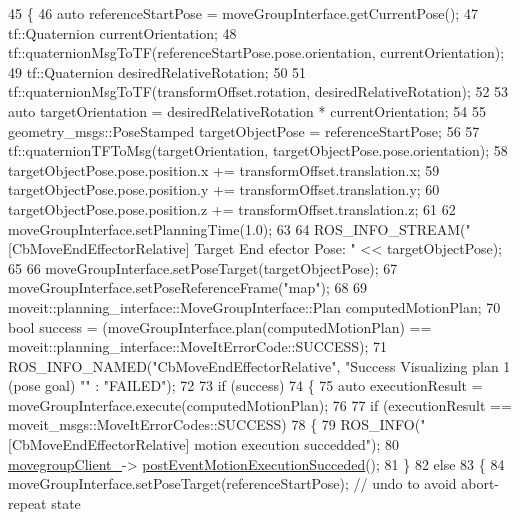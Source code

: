 \begin{DoxyCode}
45     \{
46         \textcolor{keyword}{auto} referenceStartPose = moveGroupInterface.getCurrentPose();
47         tf::Quaternion currentOrientation;
48         tf::quaternionMsgToTF(referenceStartPose.pose.orientation, currentOrientation);
49         tf::Quaternion desiredRelativeRotation;
50 
51         tf::quaternionMsgToTF(transformOffset.rotation, desiredRelativeRotation);
52 
53         \textcolor{keyword}{auto} targetOrientation = desiredRelativeRotation * currentOrientation;
54 
55         geometry\_msgs::PoseStamped targetObjectPose = referenceStartPose;
56 
57         tf::quaternionTFToMsg(targetOrientation, targetObjectPose.pose.orientation);
58         targetObjectPose.pose.position.x += transformOffset.translation.x;
59         targetObjectPose.pose.position.y += transformOffset.translation.y;
60         targetObjectPose.pose.position.z += transformOffset.translation.z;
61 
62         moveGroupInterface.setPlanningTime(1.0);
63 
64         ROS\_INFO\_STREAM(\textcolor{stringliteral}{"[CbMoveEndEffectorRelative] Target End efector Pose: "} << targetObjectPose);
65 
66         moveGroupInterface.setPoseTarget(targetObjectPose);
67         moveGroupInterface.setPoseReferenceFrame(\textcolor{stringliteral}{"map"});
68 
69         moveit::planning\_interface::MoveGroupInterface::Plan computedMotionPlan;
70         \textcolor{keywordtype}{bool} success = (moveGroupInterface.plan(computedMotionPlan) == 
      moveit::planning\_interface::MoveItErrorCode::SUCCESS);
71         ROS\_INFO\_NAMED(\textcolor{stringliteral}{"CbMoveEndEffectorRelative"}, \textcolor{stringliteral}{"Success Visualizing plan 1 (pose goal) %
      ""} : \textcolor{stringliteral}{"FAILED"});
72 
73         \textcolor{keywordflow}{if} (success)
74         \{
75             \textcolor{keyword}{auto} executionResult = moveGroupInterface.execute(computedMotionPlan);
76 
77             \textcolor{keywordflow}{if} (executionResult == moveit\_msgs::MoveItErrorCodes::SUCCESS)
78             \{
79                 ROS\_INFO(\textcolor{stringliteral}{"[CbMoveEndEffectorRelative] motion execution succedded"});
80                 \hyperlink{classmove__group__interface__client_1_1CbMoveEndEffectorRelative_a979ec9c309b1b52a0d0e254b49865fdc}{movegroupClient\_}->
      \hyperlink{classmove__group__interface__client_1_1ClMoveGroup_a1b617e0018790b8ebf23aea75eb7acba}{postEventMotionExecutionSucceded}();
81             \}
82             \textcolor{keywordflow}{else}
83             \{
84                 moveGroupInterface.setPoseTarget(referenceStartPose); \textcolor{comment}{// undo to avoid abort-repeat state
}
\end{DoxyCode}
